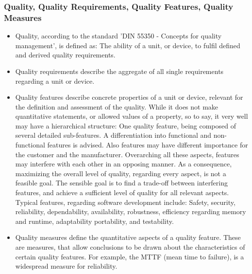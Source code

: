 	\subsubsection{Quality, Quality Requirements, Quality Features, Quality Measures}
		\begin{itemize}
		\item Quality, according to the standard 'DIN 55350 - Concepts for quality management', is defined as: The ability of a unit, or device, to fulfil defined and derived quality requirements.
		\item Quality requirements describe the aggregate of all single requirements regarding a unit or device.
		\item Quality features describe concrete properties of a unit or device, relevant for the definition and assessment of the quality. While it does not make quantitative statements, or allowed values of a property, so to say, it very well may have a hierarchical structure: One quality feature, being composed of several detailed sub-features. A differentiation into functional and non-functional features is advised. Also features may have different importance for the customer and the manufacturer. Overarching all these aspects, features may interfere with each other in an opposing manner. As a consequence, maximizing the overall level of quality, regarding every aspect, is not a feasible goal. The sensible goal is to find a trade-off between interfering features, and achieve a sufficient level of quality for all relevant aspects. Typical features, regarding software development include: Safety, security, reliability, dependability, availability, robustness, efficiency regarding memory and runtime, adaptability portability, and testability.
		\item {Quality measures} define the quantitative aspects of a quality feature. These are measures, that allow conclusions to be drawn about the characteristics of certain quality features. For example, the MTTF (mean time to failure), is a widespread measure for reliability.
		\end{itemize}
	

